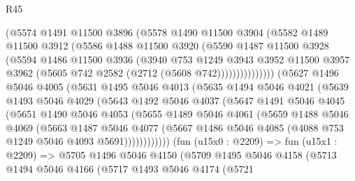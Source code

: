 \begin{lexlean}{R45}
\begin{coremodule}
                  (@5574
                    @1491
                    @11500
                    @3896
                    (@5578
                      @1490
                      @11500
                      @3904
                      (@5582
                        @1489
                        @11500
                        @3912
                        (@5586
                          @1488
                          @11500
                          @3920
                          (@5590
                            @1487
                            @11500
                            @3928
                            (@5594
                              @1486
                              @11500
                              @3936
                              (@3940
                                @753
                                @1249
                                @3943
                                @3952
                                @11500
                                @3957
                                @3962
                                (@5605 @742 @2582 (@2712 (@5608 @742)))))))))))))))
        (@5627
          @1496
          @5046
          @4005
          (@5631
            @1495
            @5046
            @4013
            (@5635
              @1494
              @5046
              @4021
              (@5639
                @1493
                @5046
                @4029
                (@5643
                  @1492
                  @5046
                  @4037
                  (@5647
                    @1491
                    @5046
                    @4045
                    (@5651
                      @1490
                      @5046
                      @4053
                      (@5655
                        @1489
                        @5046
                        @4061
                        (@5659
                          @1488
                          @5046
                          @4069
                          (@5663
                            @1487
                            @5046
                            @4077
                            (@5667 @1486 @5046 @4085 (@4088 @753 @1249 @5046 @4093 @5691))))))))))))
        (fun (u15x0 : @2209) =>
        fun (u15x1 : @2209) =>
        @5705
          @1496
          @5046
          @4150
          (@5709
            @1495
            @5046
            @4158
            (@5713
              @1494
              @5046
              @4166
              (@5717
                @1493
                @5046
                @4174
                (@5721

\end{coremodule}
\end{lexlean}

